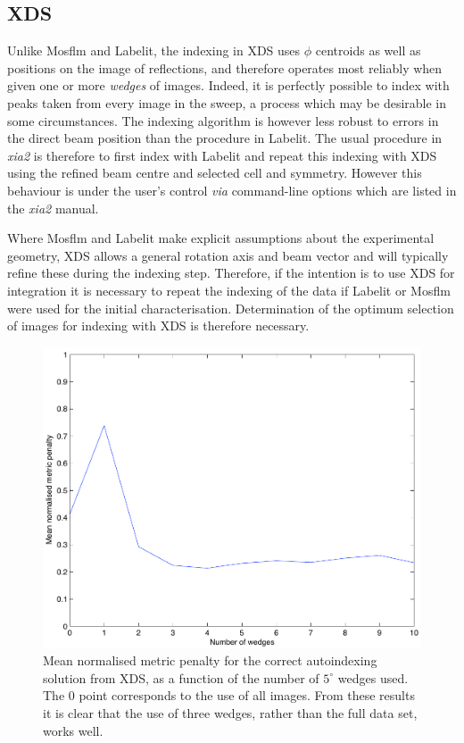 \documentclass[preprint,pdf]{iucr}
\begin{document}
\subsection{XDS}

Unlike Mosflm and Labelit, the indexing in XDS uses $\phi$
centroids as well as positions on the image of reflections, and
therefore operates most reliably when given one or more \emph{wedges} of
images. Indeed, it is perfectly possible to index with peaks taken
from every image in the sweep, a process which may be desirable in some
circumstances. The indexing algorithm is however less robust to
errors in the direct beam position than the procedure in
Labelit. The usual procedure in \emph{xia2} is therefore to first
index with Labelit and repeat this indexing with XDS
using the refined beam centre and selected cell and symmetry. However
this behaviour is under the user's control \emph{via} command-line
options which are listed in the \emph{xia2} manual.

Where Mosflm and Labelit make explicit assumptions about the experimental
geometry, XDS allows a general rotation axis and beam vector and will
typically refine these during the indexing step. Therefore, if the
intention is to use XDS for integration it is necessary to
repeat the indexing of the data if Labelit or Mosflm were used for the
initial characterisation. Determination of the optimum
selection of images for indexing with XDS is therefore necessary.

\begin{figure}
\caption{Mean normalised metric penalty for the correct autoindexing 
solution from XDS, as a function of the number of $5^{\circ}$ wedges used.
The 0 point corresponds to the use of all images. From these results it is
clear that the use of three wedges, rather than the full data set, works
well.
\label{figure:xds_n_images}}
\centering
\includegraphics[scale=0.5]{figures/xds_n_wedges.pdf}
\end{figure}
\end{document}
